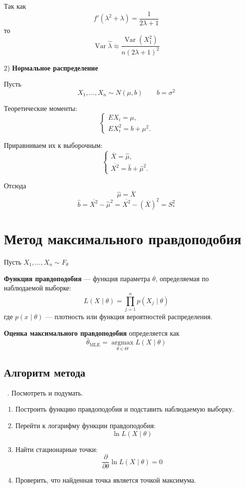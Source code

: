 \documentclass[12pt,a4paper]{article}
\begin{document}
\begin{example}
Так как
\[
f'(\lambda^2+\lambda)=\frac{1}{2\lambda+1}
\]
то
\[
\operatorname{Var}\hat{\lambda}
\approx
\frac{\operatorname{Var}(X_1^2)}
{n(2\lambda+1)^2}
\]

2) \textbf{Нормальное распределение}

Пусть
\[
X_1,\ldots,X_n\sim N(\mu,b)
\qquad b=\sigma^2
\]

Теоретические моменты:
\[
\begin{cases}
EX_i=\mu,\\
EX_i^2=b+\mu^2.
\end{cases}
\]

Приравниваем их к выборочным:
\[
\begin{cases}
\overline{X}=\hat{\mu},\\
\overline{X^2}=\hat{b}+\hat{\mu}^2.
\end{cases}
\]

Отсюда
\[
\hat{\mu}=\overline{X}
\]
\[
\hat{b}
=
\overline{X^2}-\hat{\mu}^2
=
\overline{X^2}-(\overline{X})^2
=
S_*^2
\]

\end{example}

\newpage

\section{Метод максимального правдоподобия}

Пусть $X_1,\ldots,X_n\sim F_\theta$

\begin{definition}

\textbf{Функция правдоподобия} — функция параметра $\theta$, определяемая по наблюдаемой выборке:
\[
L(X\mid\theta)
=
\prod_{j=1}^{n}p(X_j\mid\theta)
\]
где $p(x\mid\theta)$ — плотность или функция вероятностей распределения.

\textbf{Оценка максимального правдоподобия} определяется как
\[
\hat{\theta}_{\mathrm{MLE}}
=
\underset{\theta\in\Theta}{\operatorname{argmax}}
L(X\mid\theta)
\]

\end{definition}

\subsection{Алгоритм метода}

\ . Посмотреть и подумать.

\begin{enumerate}
    \item Построить функцию правдоподобия и подставить наблюдаемую выборку.

    \item Перейти к логарифму функции правдоподобия:
    \[
    \ln L(X\mid\theta)
    \]

    \item Найти стационарные точки:
    \[
    \frac{\partial}{\partial\theta}
    \ln L(X\mid\theta)=0
    \]

    \item Проверить, что найденная точка является точкой максимума.
\end{enumerate}
\end{document}

